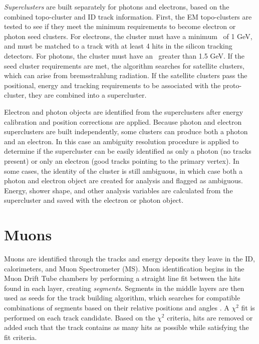 \textit{Superclusters} are built separately for photons and electrons, based on the combined topo-cluster and ID track information. First, the EM topo-clusters are tested to see if they meet the minimum requirements to become electron or photon seed clusters. For electrons, the cluster must have a minimum \et~of 1 GeV, and must be matched to a track with at least 4 hits in the silicon tracking detectors. For photons, the cluster must have an \et~greater than 1.5 GeV. If the seed cluster requirements are met, the algorithm searches for satellite clusters, which can arise from bremsstrahlung radiation. If the satellite clusters pass the positional, energy and tracking requirements to be associated with the proto-cluster, they are combined into a supercluster. \par

Electron and photon objects are identified from the superclusters after energy calibration and position corrections are applied. Because photon and electron superclusters are built independently, some clusters can produce both a photon and an electron. In this case an ambiguity resolution procedure is applied to determine if the supercluster can be easily identified as only a photon (no tracks present) or only an electron (good tracks pointing to the primary vertex). In some cases, the identity of the cluster is still ambiguous, in which case both a photon and electron object are created for analysis and flagged as ambiguous. Energy, shower shape, and other analysis variables are calculated from the supercluster and saved with the electron or photon object. 

\section{Muons}
Muons are identified through the tracks and energy deposits they leave in the ID, calorimeters, and Muon Spectrometer (MS). Muon identification begins in the Muon Drift Tube chambers by performing a straight line fit between the hits found in each layer, creating \textit{segments}. Segments in the middle layers are then used as seeds for the track building algorithm, which searches for compatible combinations of segments based on their relative positions and angles \cite{muon_reco}. A $\chi^2$ fit is performed on each track candidate. Based on the $\chi^2$ criteria, hits are removed or added such that the track contains as many hits as possible while satisfying the fit criteria. \par

